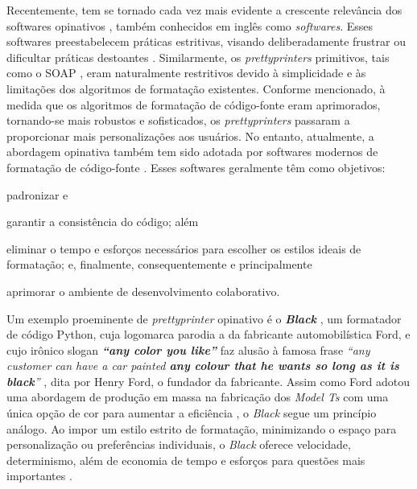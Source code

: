 \documentclass
  [11pt,a4paper,english,brazil,openright,sumario=tradicional,twoside]
  {abntex2}
\begin{document}
  Recentemente, tem se tornado cada vez mais evidente a crescente relevância
  dos softwares opinativos \cite{eccles-2015-rise}, também conhecidos em inglês
  como \textit{ softwares}. Esses softwares preestabelecem
  práticas estritivas, visando deliberadamente frustrar ou dificultar práticas
  destoantes \cite{lance-2021-about}. Similarmente, os \textit{prettyprinters}
  primitivos, tais como o SOAP \cite{scowen-1971-soap}, eram naturalmente
  restritivos devido à simplicidade e às limitações dos algoritmos de
  formatação existentes. Conforme mencionado, à medida que os algoritmos de
  formatação de código-fonte eram aprimorados, tornando-se mais robustos e
  sofisticados, os \textit{prettyprinters} passaram a proporcionar mais
  personalizações aos usuários. No entanto, atualmente, a abordagem opinativa
  também tem sido adotada por softwares modernos de formatação de código-fonte
  \cites{black-2023-black}[5--6,8]{griesemer-2022-cultural}. Esses softwares
  geralmente têm como objetivos:
  \begin{inparaenum}
    \item padronizar e
    \item garantir a consistência do código; além
    \item eliminar o tempo e esforços necessários para escolher os estilos
          ideais de formatação; e, finalmente, consequentemente e
          principalmente
    \item aprimorar o ambiente de desenvolvimento colaborativo.
  \end{inparaenum}

  Um exemplo proeminente de \textit{prettyprinter} opinativo é o
  \textit{\textbf{Black}} \cite{black-2023-black}, um formatador de código
  Python, cuja logomarca parodia a da fabricante automobilística Ford, e cujo
  irônico slogan \textit{\textbf{``any color you like''}} faz alusão à famosa
  frase
  \textit
    {%
      ``any customer can have a car painted \textbf{any colour that he wants so
      long as it is black}''}
  \cite[p. 72, grifo nosso]{ford-1922-my}, dita por Henry Ford, o fundador da
  fabricante. Assim como Ford adotou uma abordagem de produção em massa na
  fabricação dos \textit{Model Ts} com uma única opção de cor para aumentar a
  eficiência \cite{ford-1922-my}, o \textit{Black} segue um princípio análogo.
  Ao impor um estilo estrito de formatação, minimizando o espaço para
  personalização ou preferências individuais, o \textit{Black} oferece
  velocidade, determinismo, além de economia de tempo e esforços para questões
  mais importantes \cite{black-2023-black}.
\end{document}

